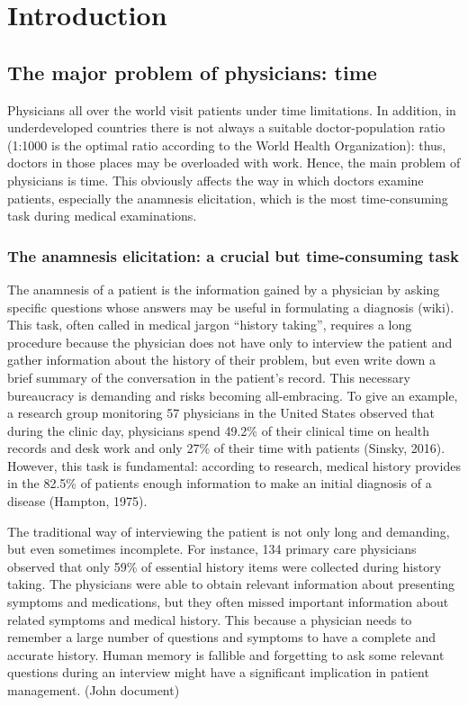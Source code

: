\chapter{Introduction}
\label{cha:intro}

\section{The major problem of physicians: time}
\label{sec:problem_doctors}

Physicians all over the world visit patients under time limitations. In addition, in underdeveloped countries there is not always a suitable doctor-population ratio (1:1000 is the optimal ratio according to the World Health Organization): thus, doctors in those places may be overloaded with work. Hence, the main problem of physicians is time. This obviously affects the way in which doctors examine patients, especially the anamnesis elicitation, which is the most time-consuming task during medical examinations.

\subsection{The anamnesis elicitation: a crucial but time-consuming task}

The anamnesis of a patient is the information gained by a physician by asking specific questions whose answers may be useful in formulating a diagnosis (wiki). This task, often called in medical jargon “history taking”, requires a long procedure because the physician does not have only to interview the patient and gather information about the history of their problem, but even write down a brief summary of the conversation in the patient’s record. This necessary bureaucracy is demanding and risks becoming all-embracing. To give an example, a research group monitoring 57 physicians in the United States observed that during the clinic day, physicians spend 49.2\% of their clinical time on health records and desk work and only 27\% of their time with patients (Sinsky, 2016). However, this task is fundamental: according to research, medical history provides in the 82.5\% of patients enough information to make an initial diagnosis of a disease (Hampton, 1975).

The traditional way of interviewing the patient is not only long and demanding, but even sometimes incomplete. For instance, 134 primary care physicians observed that only 59\% of essential history items were collected during history taking. The physicians were able to obtain relevant information about presenting symptoms and medications, but they often missed important information about related symptoms and medical history. This because a physician needs to remember a large number of questions and symptoms to have a complete and accurate history. Human memory is fallible and forgetting to ask some relevant questions during an interview might have a significant implication in patient management. (John document)

